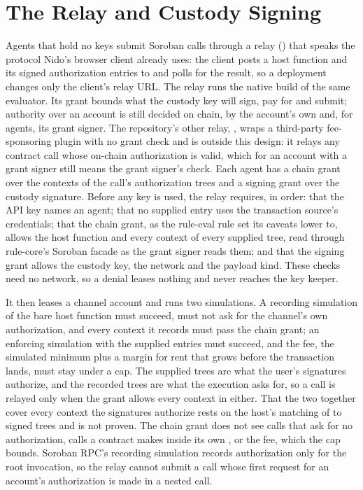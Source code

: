 \section{The Relay and Custody Signing}\label{sec:relay}

Agents that hold no keys submit Soroban calls through a relay
() that speaks the protocol Nido's browser client
already uses: the client posts a host function and its signed authorization
entries to  and polls for the result, so a deployment changes only
the client's relay URL. The relay runs the native build
of the same evaluator. Its grant bounds what the custody key will sign, pay
for and submit; authority over an account is still decided on chain, by the
account's own  and, for agents, its grant signer. The
repository's other relay, , wraps a third-party
fee-sponsoring plugin with no grant check and is outside this design: it
relays any contract call whose on-chain authorization is valid, which for an
account with a grant signer still means the grant signer's check. Each agent has a chain grant over the contexts of the
call's authorization trees and a signing grant over the custody signature.
Before any key is used, the relay requires, in order: that the API key names
an agent; that no supplied entry uses the transaction source's credentials;
that the chain grant, as the rule-eval rule set its caveats lower to, allows
the host function and every context of every supplied tree, read through
rule-core's Soroban facade as the grant signer reads them; and that the
signing grant allows the custody key, the
network and the  payload kind. These checks need no network,
so a denial leases nothing and never reaches the key
keeper.

It then leases a channel account and runs two simulations. A recording
simulation of the bare host function must succeed, must not ask for the
channel's own authorization, and every context it
records must pass the chain grant; an enforcing
simulation with the supplied entries must succeed, and the fee, the simulated
minimum plus a margin for rent that grows before the transaction lands, must
stay under a cap. The supplied trees are what the
user's signatures authorize, and the recorded trees are what the execution asks for, so a call is relayed only when
the grant allows every context in either. That the two together cover every
context the signatures authorize rests on the host's matching of
 to signed trees and is not proven. The
chain grant does not see calls that ask for no authorization, calls a contract
makes inside its own , or the fee, which the cap bounds.
Soroban RPC's recording simulation records authorization only for the root
invocation, so the relay cannot submit a call whose first request for an
account's authorization is made in a nested call.

